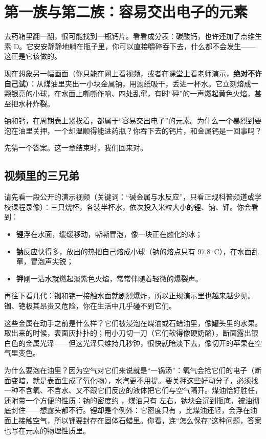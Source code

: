 \chapter{第一族与第二族：容易交出电子的元素}

\begin{kaichang}
去药箱里翻一翻，很可能找到一瓶钙片。看看成分表：碳酸钙，也许还加了点维生素 D。它安安静静地躺在瓶子里，你可以直接嚼碎吞下去，什么都不会发生——这正是它该做的。

现在想象另一幅画面（你只能在网上看视频，或者在课堂上看老师演示，\textbf{绝对不许自己试}）：从煤油里夹出一小块金属钠，用滤纸吸干，丢进一杯水。它立刻熔成一颗银亮的小球，在水面上嘶嘶作响、四处乱窜，有时“砰”的一声燃起黄色火焰，甚至把水杯炸裂。

钠和钙，在周期表上紧挨着，都属于“容易交出电子”的元素。为什么一个暴烈到要泡在油里关押，一个却温顺得能进药瓶？你吞下去的钙片，和金属钙是一回事吗？

先猜一个答案。这一章结束时，我们回来对。
\end{kaichang}

\section{视频里的三兄弟}

请先看一段公开的演示视频（关键词：“碱金属与水反应”，只看正规科普频道或学校课程录像）：三只烧杯，各装半杯水，依次投入米粒大小的锂、钠、钾。你会看到：

\begin{itemize}[itemsep=2pt]
\item \textbf{锂}浮在水面，缓缓移动，嘶嘶冒泡，像一块正在融化的冰；
\item \textbf{钠}反应快得多，放出的热把自己熔成小球（钠的熔点只有 $97.8\,^{\circ}\mathrm{C}$），在水面乱窜，冒泡声尖锐；
\item \textbf{钾}刚一沾水就燃起淡紫色火焰，常常伴随着轻微的爆裂声。
\end{itemize}

再往下看几代：铷和铯一接触水面就剧烈爆炸，所以正规演示里也越来越少见。铷、铯极其昂贵又危险，你在生活中几乎碰不到它们。

这些金属在动手之前是什么样？它们被浸泡在煤油或石蜡油里，像罐头里的水果。取出来的时候，表面灰扑扑的；用小刀切一刀（它们软得像硬奶酪），断面露出银白色的金属光泽——但这光泽只维持几秒钟，很快就暗淡下去，像切开的苹果在空气里变色。

为什么要泡在油里？因为空气对它们来说就是“一锅汤”：氧气会抢它们的电子（断面变暗，就是表面生成了氧化物），水汽更不用提。要关押这些好动分子，必须找一种不含氧、不含水、又不跟它们反应的液体把它们与空气隔开。煤油恰好胜任，还附带一个方便的性质：钠的密度约 ，煤油只有  左右，钠块会沉到瓶底，被油彻底封住——想露头都不行。锂却是个例外：它密度只有 ，比煤油还轻，会浮在油面上接触空气，所以锂要封存在固体石蜡里。你看，连“怎么保存”这种问题，答案也写在元素的物理性质里。

